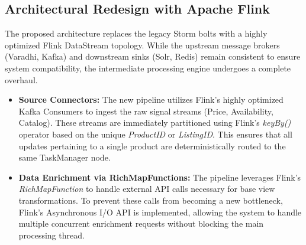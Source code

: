 \subsection{Architectural Redesign with Apache Flink}
\begin{justify}
    The proposed architecture replaces the legacy Storm bolts with a highly optimized Flink DataStream topology. While the upstream message brokers (Varadhi, Kafka) and downstream sinks (Solr, Redis) remain consistent to ensure system compatibility, the intermediate processing engine undergoes a complete overhaul.
    
    
    
    \begin{itemize}
        \item \textbf{Source Connectors:} The new pipeline utilizes Flink's highly optimized Kafka Consumers to ingest the raw signal streams (Price, Availability, Catalog). These streams are immediately partitioned using Flink's \textit{keyBy()} operator based on the unique \textit{ProductID} or \textit{ListingID}. This ensures that all updates pertaining to a single product are deterministically routed to the same TaskManager node.
        \item \textbf{Data Enrichment via RichMapFunctions:} The pipeline leverages Flink's \textit{RichMapFunction} to handle external API calls necessary for base view transformations. To prevent these calls from becoming a new bottleneck, Flink's Asynchronous I/O API is implemented, allowing the system to handle multiple concurrent enrichment requests without blocking the main processing thread.
    \end{itemize}
\end{justify}

